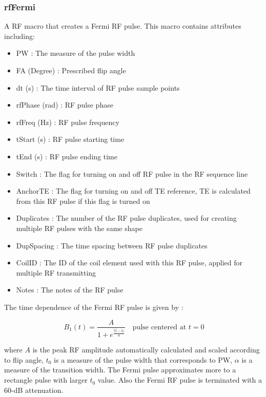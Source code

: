 \documentclass{book}%
\begin{document}
\subsubsection{rfFermi}

A RF macro that creates a Fermi RF pulse. This macro contains attributes including:

\begin{itemize}
	\item PW : The measure of the pulse width
	\item FA (Degree) : Prescribed flip angle 
	\item dt (s) : The time interval of RF pulse sample points
	\item rfPhase (rad) : RF pulse phase
	\item rfFreq (Hz) : RF pulse frequency
	\item tStart (s) : RF pulse starting time
	\item tEnd (s) : RF pulse ending time
	\item Switch : The flag for turning on and off RF pulse in the RF sequence line
	\item AnchorTE : The flag for turning on and off TE reference, TE is calculated from this RF pulse if this flag is turned on
	\item Duplicates : The number of the RF pulse duplicates, used for creating multiple RF pulses with the same shape
	\item DupSpacing : The time spacing between RF pulse duplicates
	\item CoilID : The ID of the coil element used with this RF pulse, applied for multiple RF transmitting
	\item Notes : The notes of the RF pulse 
\end{itemize}

The time dependence of the Fermi RF pulse is given by \cite{Handbook2004}:

\begin{equation}\
B_1(t) = \frac{A}{1+e^{\frac{|t|-t_0}{\alpha}}} \quad \text{pulse centered at } t = 0
\label{eq:Fermi}
\end{equation}

where $A$ is the peak RF amplitude automatically calculated and scaled according to flip angle, $t_0$ is a measure of the pulse width that corresponds to PW, $\alpha$ is a measure of the transition width. The Fermi pulse approximates more to a rectangle pulse with larger $t_0$ value. Also the Fermi RF pulse is terminated with a 60-dB attenuation.
\end{document}
